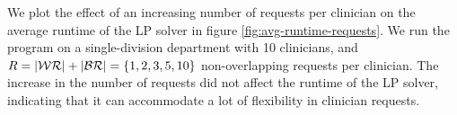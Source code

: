



We plot the effect of an increasing number of requests per clinician on the average runtime of the LP solver in figure \ref{fig:avg-runtime-requests}. We run the program on a single-division department with 10 clinicians, and $R = \abs{\mathcal{WR}} + \abs{\mathcal{BR}} = \{1, 2, 3, 5, 10\}$ non-overlapping requests per clinician. The increase in the number of requests did not affect the runtime of the LP solver, indicating that it can accommodate a lot of flexibility in clinician requests. \\

